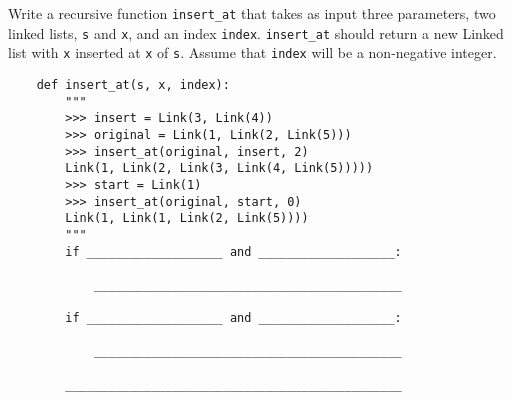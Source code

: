 \begin{blocksection}
    \question Write a recursive function \lstinline{insert_at} that takes as input three parameters, two linked lists, \lstinline{s}  and \lstinline{x}, and an index \lstinline{index}.  \lstinline{insert_at} should return a new Linked list with \lstinline{x} inserted at \lstinline{x} of \lstinline{s}. Assume that \lstinline{index} will be a non-negative integer.

    
    \begin{lstlisting}
    def insert_at(s, x, index):
        """
        >>> insert = Link(3, Link(4))
        >>> original = Link(1, Link(2, Link(5)))
        >>> insert_at(original, insert, 2)
        Link(1, Link(2, Link(3, Link(4, Link(5)))))
        >>> start = Link(1)
        >>> insert_at(original, start, 0)
        Link(1, Link(1, Link(2, Link(5))))
        """
        if ___________________ and ___________________:

            ___________________________________________

        if ___________________ and ___________________:

            ___________________________________________

        _______________________________________________
    
    \end{lstlisting}
\end{blocksection}
